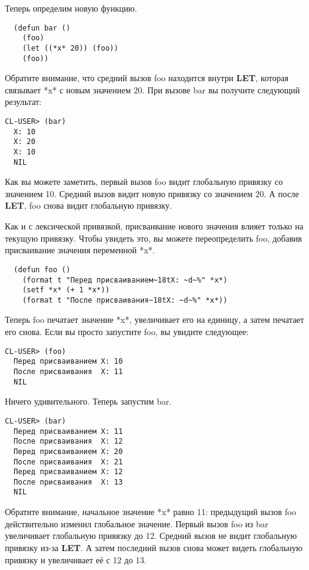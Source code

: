Теперь определим новую функцию.

\begin{lstlisting}
  (defun bar ()
    (foo)
    (let ((*x* 20)) (foo))
    (foo))
\end{lstlisting}

Обратите внимание, что средний вызов foo находится внутри \textbf{LET}, которая связывает
*x* с новым значением 20. При вызове bar вы получите следующий результат:

\begin{lstlisting}[style=lisprepl]
  CL-USER> (bar)
  X: 10
  X: 20
  X: 10
  NIL
\end{lstlisting}

Как вы можете заметить, первый вызов foo видит глобальную привязку со значением
10. Средний вызов видит новую привязку со значением 20. А после \textbf{LET}, foo снова
видит глобальную привязку.

Как и с лексической привязкой, присваивание нового значения влияет только на текущую
привязку. Чтобы увидеть это, вы можете переопределить foo, добавив присваивание значения
переменной *x*.

\begin{lstlisting}
  (defun foo ()
    (format t "Перед присваиванием~18tX: ~d~%" *x*)
    (setf *x* (+ 1 *x*))
    (format t "После присваивания~18tX: ~d~%" *x*))
\end{lstlisting}

Теперь foo печатает значение *x*, увеличивает его на единицу, а затем печатает его
снова. Если вы просто запустите foo, вы увидите следующее:

\begin{lstlisting}[style=lisprepl]
  CL-USER> (foo)
  Перед присваиванием X: 10
  После присваивания  X: 11
  NIL
\end{lstlisting}

Ничего удивительного. Теперь запустим bar.

\begin{lstlisting}[style=lisprepl]
  CL-USER> (bar)
  Перед присваиванием X: 11
  После присваивания  X: 12
  Перед присваиванием X: 20
  После присваивания  X: 21
  Перед присваиванием X: 12
  После присваивания  X: 13
  NIL
\end{lstlisting}

Обратите внимание, начальное значение *x* равно 11: предыдущий вызов foo действительно
изменил глобальное значение. Первый вызов foo из bar увеличивает глобальную привязку до
12. Средний вызов не видит глобальную привязку из-за \textbf{LET}. А затем последний вызов
снова может видеть глобальную привязку и увеличивает её с 12 до 13.


